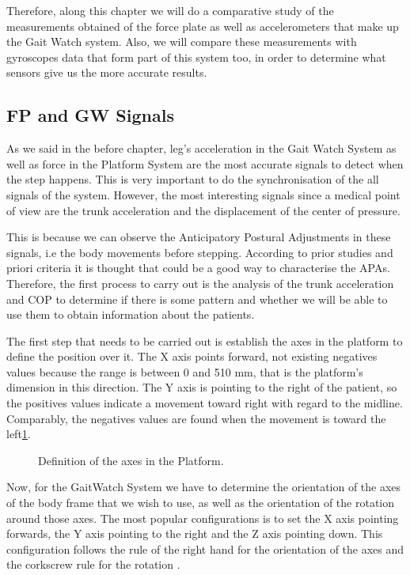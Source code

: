 Therefore, along this chapter we will do a comparative study of the measurements obtained of the force plate as well as accelerometers that make up the Gait Watch system. Also, we will compare these measurements with gyroscopes data that form part of this system too, in order to determine what sensors give us the more accurate results.

\subsection{FP and GW Signals}
As we said in the before chapter, leg's acceleration in the Gait Watch System as well as force in the Platform System are the most accurate signals to detect when the step happens. This is very important to do the synchronisation of the all signals of the system. However, the most interesting signals since a medical point of view are the trunk acceleration and the displacement of the center of pressure.

This is because we can observe the Anticipatory Postural Adjustments in these signals, i.e the body movements before stepping. According to prior studies and priori criteria it is thought that could be a good way to characterise the APAs.
Therefore, the first process to carry out is the analysis of the trunk acceleration and COP to determine if there is some pattern and whether we will be able to use them to obtain information about the patients.

The first step that needs to be carried out is establish the axes in the platform to define the position over it. The X axis points forward, not existing negatives values because the range is between 0 and 510 mm, that is the platform’s dimension in this direction. The Y axis is pointing to the right of the patient, so the positives values indicate a movement toward right with regard to the midline. Comparably, the negatives values are found when the movement is toward the left\ref{fig:axesFP}.

\begin{figure}[H]
	\centering
	\caption{Definition of the axes in the Platform.}
	\label{fig:axesFP}
\end{figure}

Now, for the GaitWatch System we have to determine the orientation of the axes of the body frame that we wish to use, as well as the orientation of the rotation around those axes. The most popular configurations is to set the X axis pointing forwards, the Y axis pointing to the right and the Z axis pointing down. This configuration follows the rule of the right hand for the orientation of the axes and the corkscrew rule for the rotation \cite{OlivaresBotzel2013}. 

